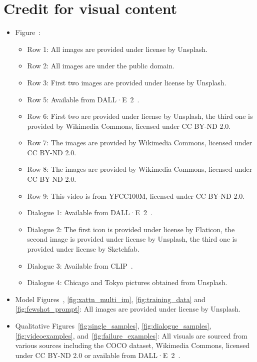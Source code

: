 \section{Credit for visual content}
\label{app:visual_content_credit}

\begin{itemize}
    \item Figure~:
    \begin{itemize}
        \item Row 1: All images are provided under license by Unsplash.
        \item Row 2: All images are under the public domain.
        \item Row 3: First two images are provided under license by Unsplash.  %
        \item Row 5: Available from DALL·E~2~\citep{ramesh2022hierarchical}.
        \item Row 6: First two are provided under license by Unsplash, the third one is provided by  Wikimedia Commons, licensed under CC BY-ND 2.0.
        \item Row 7: The images are provided by Wikimedia Commons, licensed under CC BY-ND 2.0.
        \item Row 8: The images are provided by Wikimedia Commons, licensed under CC BY-ND 2.0.
        \item Row 9: This video is from YFCC100M, licensed under CC BY-ND 2.0.
        \item Dialogue 1: Available from DALL·E~2~\citep{ramesh2022hierarchical}.
        \item Dialogue 2: The first icon is provided under license by Flaticon, the second image is provided under license by Unsplash, the third one is provided under license by Sketchfab.
        \item Dialogue 3: Available from CLIP~\citep{clip}.
        \item Dialogue 4: Chicago and Tokyo pictures obtained from Unsplash.
    \end{itemize}
    \item Model Figures~, \ref{fig:xattn_multi_im}, \ref{fig:training_data} and \ref{fig:fewshot_prompt}: All images are provided under license by Unsplash.
    \item Qualitative Figures~\ref{fig:single_samples}, \ref{fig:dialogue_samples}, \ref{fig:videoexamples}, and~\ref{fig:failure_examples}: All visuals are sourced from various sources including the COCO dataset, Wikimedia Commons, licensed under CC BY-ND 2.0 or available from DALL·E~2~\citep{ramesh2022hierarchical}.
\end{itemize}
